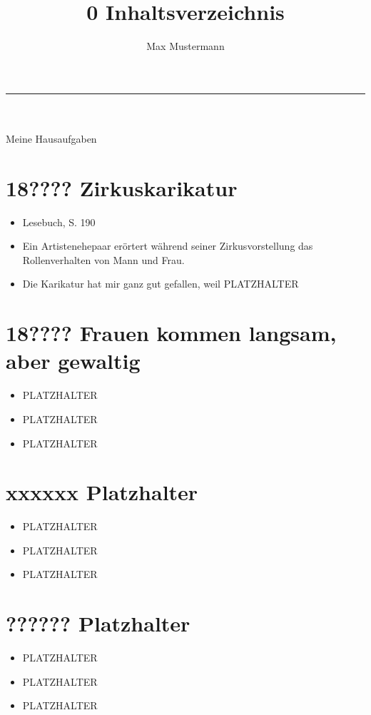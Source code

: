 \documentclass[12pt,a4paper]{scrartcl}
\title{0 Inhaltsverzeichnis}
\author{Max Mustermann}
\makeatletter
\newcommand{\linia}{\rule{\linewidth}{0.5pt}}
\renewcommand{\maketitle}{\begin{center}
\huge \@title\end{center}
\linia\\
{\large\@author\hfill\@date\\}}
\makeatother
\begin{document}
\maketitle
Meine Hausaufgaben %
\section{18???? Zirkuskarikatur}
\begin{itemize}
    \item Lesebuch, S. 190 
    \item Ein Artistenehepaar erörtert während seiner Zirkusvorstellung das Rollenverhalten von Mann und Frau.
    \item Die Karikatur hat mir ganz gut gefallen, weil PLATZHALTER
\end{itemize}
\section{18???? Frauen kommen langsam, aber gewaltig}
\begin{itemize}
    \item PLATZHALTER
    \item PLATZHALTER
    \item PLATZHALTER
\end{itemize}
\section{xxxxxx Platzhalter}
\begin{itemize}
    \item PLATZHALTER
    \item PLATZHALTER
    \item PLATZHALTER
\end{itemize}
\section{?????? Platzhalter}
\begin{itemize}
    \item PLATZHALTER
    \item PLATZHALTER
    \item PLATZHALTER
\end{itemize}
\end{document}
